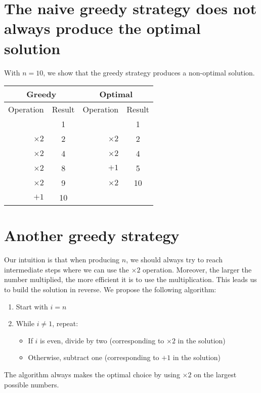 
\section{The naive greedy strategy does not always produce the optimal solution}

With $n = 10$, we show that the greedy strategy produces a non-optimal solution.

\begin{center}
  \begin{tabular}{|r|c|r|c|}
    \multicolumn{2}{c}{Greedy} & \multicolumn{2}{c}{Optimal} \\
    \hline
    Operation & Result & Operation & Result \\
    \hline
               &  1 &            &  1 \\
    $\times 2$ &  2 & $\times 2$ &  2 \\
    $\times 2$ &  4 & $\times 2$ &  4 \\
    $\times 2$ &  8 & $+1$       &  5 \\
    $\times 2$ &  9 & $\times 2$ & 10 \\
    $+1$       & 10 & \multicolumn{2}{c|}{} \\
    \hline
  \end{tabular}
\end{center}

\section{Another greedy strategy}

Our intuition is that when producing $n$, we should always try to reach intermediate steps where we can use the $\times 2$ operation. Moreover, the larger the number multiplied, the more efficient it is to use the multiplication. This leads us to build the solution in reverse. We propose the following algorithm:

\begin{enumerate}
  \item Start with $i = n$
  \item While $i \neq 1$, repeat:
  \begin{itemize}
    \item If $i$ is even, divide by two (corresponding to $\times 2$ in the solution)
    \item Otherwise, subtract one (corresponding to $+1$ in the solution)
  \end{itemize}
\end{enumerate}

\noindent
The algorithm always makes the optimal choice by using $\times 2$ on the largest possible numbers.
